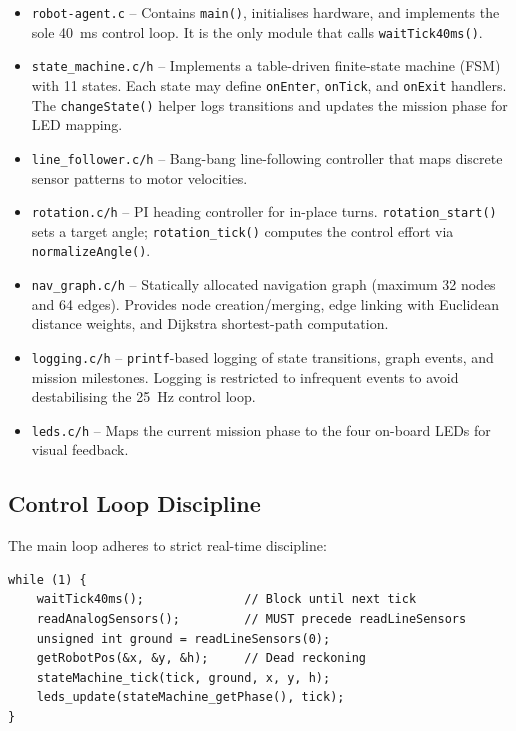 \documentclass[runningheads]{llncs}
\begin{document}
\begin{itemize}
    \item \texttt{robot-agent.c} -- Contains \texttt{main()}, initialises hardware, and implements the sole 40~ms control loop. It is the only module that calls \texttt{waitTick40ms()}.
    \item \texttt{state\_machine.c/h} -- Implements a table-driven finite-state machine (FSM) with 11 states. Each state may define \texttt{onEnter}, \texttt{onTick}, and \texttt{onExit} handlers. The \texttt{changeState()} helper logs transitions and updates the mission phase for LED mapping.
    \item \texttt{line\_follower.c/h} -- Bang-bang line-following controller that maps discrete sensor patterns to motor velocities.
    \item \texttt{rotation.c/h} -- PI heading controller for in-place turns. \texttt{rotation\_start()} sets a target angle; \texttt{rotation\_tick()} computes the control effort via \texttt{normalizeAngle()}.
    \item \texttt{nav\_graph.c/h} -- Statically allocated navigation graph (maximum 32 nodes and 64 edges). Provides node creation/merging, edge linking with Euclidean distance weights, and Dijkstra shortest-path computation.
    \item \texttt{logging.c/h} -- \texttt{printf}-based logging of state transitions, graph events, and mission milestones. Logging is restricted to infrequent events to avoid destabilising the 25~Hz control loop.
    \item \texttt{leds.c/h} -- Maps the current mission phase to the four on-board LEDs for visual feedback.
\end{itemize}

\subsection{Control Loop Discipline}

The main loop adheres to strict real-time discipline:

\begin{lstlisting}[caption={Main control loop in \texttt{robot-agent.c}.},label={lst:mainloop}]
while (1) {
    waitTick40ms();              // Block until next tick
    readAnalogSensors();         // MUST precede readLineSensors
    unsigned int ground = readLineSensors(0);
    getRobotPos(&x, &y, &h);     // Dead reckoning
    stateMachine_tick(tick, ground, x, y, h);
    leds_update(stateMachine_getPhase(), tick);
}
\end{lstlisting}
\end{document}
